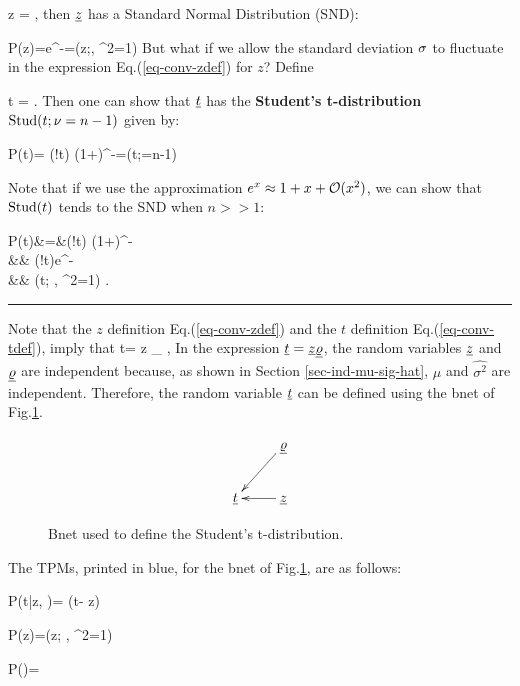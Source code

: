 \beq
z =
\label{eq-conv-zdef}
\;,
\eeq
then ${\underline{z}}$ has a Standard Normal
 Distribution (SND):

\beq
P(z)=e^{-}=\caln(z;, \s^2=1)
\eeq
But what if we allow the standard deviation $\sigma$
to fluctuate in the expression
Eq.(\ref{eq-conv-zdef}) for $z$?
Define

\beq
t =
\;.
\label{eq-conv-tdef}
\eeq
Then one can show that 
${\underline{t}}$
has the {\bf Student's t-distribution}
${\rm Stud}(t;\nu=n-1)$
given by:

\beq
P(t)=
\caln(!t)
(1+)^{-}=(t;\nu=n-1)
\eeq

Note that if we use the approximation
$e^x\approx 1 +x +{\cal O}(x^2)$,
we can show that ${\rm Stud}(t)$
tends to the SND
when $n>>1$:

\beqa
P(t)&=&\caln(!t)
(1+)^{-}
\\
&\approx&
\caln(!t)e^{-}
\\
&\approx&
\caln(t; , \s^2=1)
\;.
\eeqa

\hrule{}

Note that the $z$ definition
Eq.(\ref{eq-conv-zdef})
and the $t$ definition
Eq.(\ref{eq-conv-tdef}),
imply that
\beq
t= z 
_{\varrho}
\;,
\eeq
In the
expression ${\underline{t}}={\underline{z}}\underline{\varrho}$,
the 
 random variables 
${\underline{z}}$ and $\underline{\varrho}$
are independent
because, as shown in Section
\ref{sec-ind-mu-sig-hat},  
 $\hat{\mu}$
and $\hat{\sigma^2}$
are independent.
Therefore, the random variable ${\underline{t}}$
can be defined using the bnet
of Fig.\ref{fig-stud-bnet}.

\begin{figure}[h!]
$$
\xymatrix{
&\ul{\varrho}\ar[ld]
\\
\rvt&\rvz\ar[l]
}
$$
\caption{Bnet used to define
the Student's t-distribution.}
\label{fig-stud-bnet}
\end{figure}
The TPMs, printed in blue,
for the bnet of Fig.\ref{fig-stud-bnet},
are as follows:

\beq\color{blue}
P(t|z, \varrho)=
\delta(t- z\varrho)
\;\;\;
\eeq

\beq\color{blue}
P(z)=\caln(z; , \s^2=1)
\eeq

\beq\color{blue}
P(\varrho)=
\eeq

